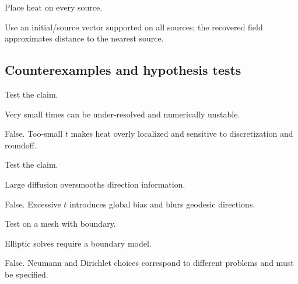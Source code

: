 \begin{hint}
Place heat on every source.
\end{hint}

\begin{solution}
Use an initial/source vector supported on all sources; the recovered field approximates distance to the nearest source.
\end{solution}

\subsection*{Counterexamples and hypothesis tests}

\begin{exercise}\label{exr:vii40-ped-10}
Test the claim.
\end{exercise}

\begin{hint}
Very small times can be under-resolved and numerically unstable.
\end{hint}

\begin{solution}
False.  Too-small \(t\) makes heat overly localized and sensitive to discretization and roundoff.
\end{solution}

\begin{exercise}\label{exr:vii40-ped-11}
Test the claim.
\end{exercise}

\begin{hint}
Large diffusion oversmooths direction information.
\end{hint}

\begin{solution}
False.  Excessive \(t\) introduces global bias and blurs geodesic directions.
\end{solution}

\begin{exercise}\label{exr:vii40-ped-12}
Test on a mesh with boundary.
\end{exercise}

\begin{hint}
Elliptic solves require a boundary model.
\end{hint}

\begin{solution}
False.  Neumann and Dirichlet choices correspond to different problems and must be specified.
\end{solution}

